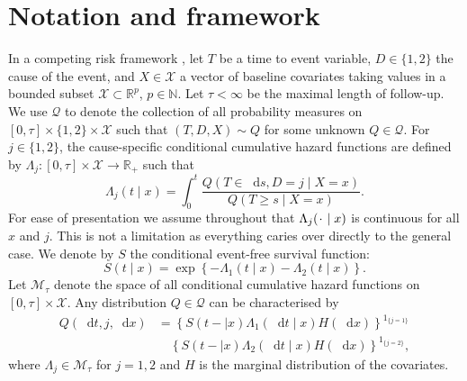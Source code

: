 \documentclass[unnumsec,webpdf,contemporary,large,namedate]{oup-authoring-template}%
\theoremstyle{thmstyleone}%
\theoremstyle{thmstyletwo}%
\theoremstyle{thmstylethree}%
\newcommand{\R}{\mathbb{R}}
\newcommand{\N}{\mathbb{N}}
\newcommand{\blank}{\makebox[1ex]{\textbf{$\cdot$}}}
\newcommand*\diff{\mathop{}\!\mathrm{d}}
\newcommand{\1}{\mathds{1}}
\begin{document}
\section{Notation and framework}
\label{sec:framework}

In a competing risk framework \citep{andersen2012statistical}, let \( T\) be a
time to event variable, \(D\in\{1,2\}\) the cause of the event, and
$X \in \mathcal{X}$ a vector of baseline covariates taking values in a bounded
subset \( \mathcal{X} \subset \R^p \), \( p\in\N \). Let $\tau< \infty$ be the
maximal length of follow-up. We use \( \mathcal{Q} \) to denote the collection
of all probability measures on \( [0,\tau] \times \{1,2\}\times \mathcal{X} \)
such that \( (T, D, X) \sim Q \) for some unknown \( Q \in \mathcal{Q} \). For
\(j\in\{1,2\}\), the cause-specific conditional cumulative hazard functions are
defined by
\( \Lambda_{j} \colon [0, \tau] \times \mathcal{X} \rightarrow \R_+ \) such that
\begin{equation*}
  \Lambda_{j}(t \mid x) = \int_0^t\frac{  Q(T \in \diff s, D=j \mid X=x )}{Q(T \geq s \mid X=x )}.
\end{equation*}
For ease of presentation we assume throughout that
\( \Lambda_j(\blank \mid x) \) is continuous for all \( x \) and
\( j \). This is not a limitation as everything caries over directly
to the general case. We denote by \(S\) the conditional event-free
survival function:
\begin{equation}
  \label{eq:surv-def}
  S(t \mid x)=\exp\left\{-\Lambda_{1}(t \mid x)-\Lambda_{2}(t \mid x)\right\}.
\end{equation}
Let \( \mathcal{M}_{\tau}\) denote the space of all conditional cumulative hazard
functions on \( [0,\tau] \times\mathcal{X}\). Any distribution
\( Q \in \mathcal{Q} \) can be characterised by
\begin{equation*}
  \label{eq:parametrizeQ}
  \begin{split}
    Q(\diff t,j,\diff x)&= \left\{S(t- \mid x)\Lambda_1(\diff t \mid x)H(\diff x)\right\}^{1_{\{j=1\}}}\\
                        &\quad\left\{S(t- \mid x)\Lambda_2(\diff t \mid x)H(\diff x)\right\}^{1_{\{j=2\}}},
  \end{split}
\end{equation*}
where \(\Lambda_{j} \in \mathcal{M}_{\tau}\) for \(j=1,2\) and \(H\) is the marginal
distribution of the covariates.
\end{document}
